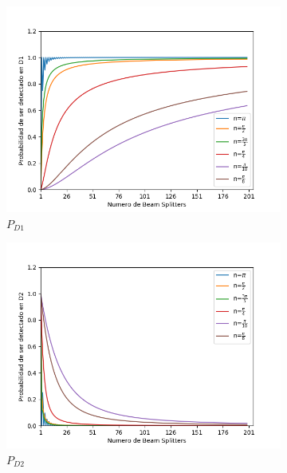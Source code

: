 \documentclass[11pt]{article}
\begin{document}
 
\begin{figure}[h!]
\centering
\begin{subfigure}[b]{0.45\linewidth}
\includegraphics[width=\linewidth]{BS_Azuna.png}
\caption{$P_{D1}$}
\label{fig:BS1}
\end{subfigure}
\begin{subfigure}[b]{0.45\linewidth}
\includegraphics[width=\linewidth]{BS_AzunaD2.png}
\caption{$P_{D2}$}
\label{fig:westminster_aerea}
\end{subfigure}
\begin{subfigure}[b]{0.45\linewidth}

\end{subfigure}
\end{figure}
\end{document}
